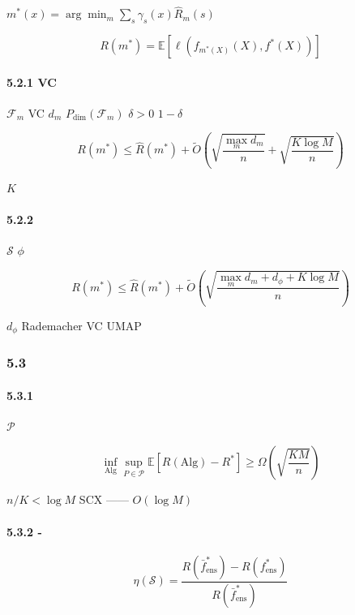 \documentclass[
  12pt,
]{article}
\begin{document}
\(m^*(x) = \arg\min_m \sum_s \gamma_s(x) \hat{R}_m(s)\)

\[R(m^*) = \mathbb{E}[\ell(f_{m^*(X)}(X), f^*(X))]\]

\paragraph{5.2.1  VC
}\label{ux57faux4e8e-vc-ux7ef4ux7684ux8fb9ux754c}

 \(\mathcal{F}_m\)  VC  \(d_m\)
\(P_{\dim}(\mathcal{F}_m)\) \(\delta > 0\)
\(1 - \delta\)

\[R(m^*) \leq \hat{R}(m^*) + \tilde{O}\left(\sqrt{\frac{\max_m d_m}{n}} + \sqrt{\frac{K \log M}{n}}\right)\]

\(K\) 

\paragraph{5.2.2
}\label{ux82e5ux72b6ux6001ux5212ux5206ux4e5fux662fux6570ux636eux9a71ux52a8ux7684}

 \(\mathcal{S}\)  \(\phi\)


\[R(m^*) \leq \hat{R}(m^*) + \tilde{O}\left(\sqrt{\frac{\max_m d_m + d_{\phi} + K \log M}{n}}\right)\]

 \(d_{\phi}\)  Rademacher  VC  UMAP


\subsubsection{5.3 }\label{ux4fe1ux606fux8bbaux4e0bux754c}

\paragraph{5.3.1
}\label{ux72b6ux6001ux7ea7ux6700ux574fux60c5ux51b5ux9519ux8befux7387}

 \(\mathcal{P}\)

\[\inf_{\text{Alg}} \sup_{P \in \mathcal{P}} \mathbb{E}[R(\text{Alg}) - R^*] \geq \Omega\left(\sqrt{\frac{K M}{n}}\right)\]

 \(n/K < \log M\)  SCX
\textbf{}------
\(O(\log M)\) 

\paragraph{5.3.2
-}\label{ux6700ux5c0f-ux6700ux5927ux98ceux9669ux6bd4ux7387}



\[\eta(\mathcal{S}) = \frac{R(\bar{f}_{\text{ens}}^*) - R(f_{\text{ens}}^*)}{R(\bar{f}_{\text{ens}}^*)}\]
\end{document}
